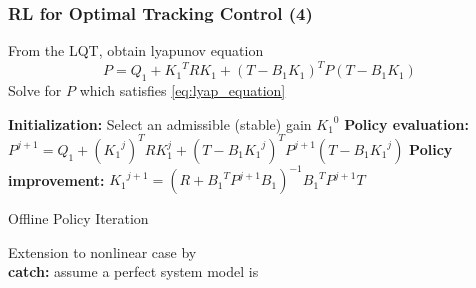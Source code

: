 \documentclass{beamer}
\begin{document}
			\begin{frame}\frametitle{RL for Optimal Tracking Control (4)}
			\vspace{3mm}
			\fontsize{8}{4}\selectfont 
			From the LQT, obtain lyapunov equation
			\begin{equation}
				P =  Q_1 + {K_1}^TRK_1 + (T - B_1K_1)^TP(T - B_1K_1)
			\label{eq:lyap_equation}
			\end{equation}		
			Solve for $ P $ which satisfies \eqref{eq:lyap_equation}
			
			\begin{algorithm}[H]
			\begin{algorithmic}[1] 	
				\fontsize{8}{4}\selectfont			
				\STATE \textbf{Initialization:} Select an admissible (stable) gain ${K_1}^0$
				\REPEAT
					\STATE 	\textbf{Policy evaluation:} 
					\STATE 	$P^{j+1} = Q_1 + ({K_1}^j)^TRK_1^j + (T-B_1{K_1}^j)^TP^{j+1}(T-B_1{K_1}^j)$
					\STATE 	
					\STATE 	\textbf{Policy improvement:} 
					\STATE 	$ {K_1}^{j+1} = (R+{B_1}^TP^{j+1}B_1)^{-1} {B_1}^TP^{j+1}T $	
				\caption{Offline Policy Iteration}
			\end{algorithmic}
			\end{algorithm}
			\pause
			Extension to nonlinear case by \citet{Modares20141780} \\		
			\pause	
			\textbf{catch:} assume a perfect system model is 
			
			\end{frame}
			
\end{document}
